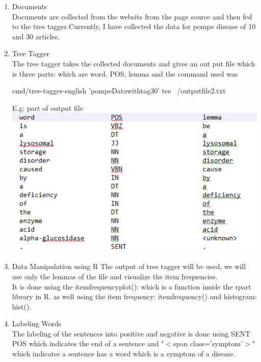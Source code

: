 \documentclass{article}
\begin{document}
	\begin{enumerate} 
		\item Documents\\
		Documents are collected from the website from the page source and then fed to the tree tagger.Currently, I have collected the data for pompe disease of 10 and 30 articles. 
		\item Tree Tagger\\ 
		The tree tagger takes the collected documents and gives an out put file which is three parts: which are word, POS, lemma and the command used was 
		
		cmd/tree-tagger-english 'pompeDatawithtag30' tee ~/outputfile2.txt
		
		\newpage
		E.g: part of output file\\
		\includegraphics[scale=0.8]{eg.PNG}\\   
		\item Data Manipulation using R
		The output of tree tagger will be used, we will use only the lemmas of the file and visualize the item frequencies.\\
		It is done using the itemfrequencyplot(): which is a function inside the rpart library in R. as well using the item frequency: itemfrequency() and histogram: hist(). 
		
		
		\item Labeling Words\\
		
		The labeling of the sentences into positive and negative is done using SENT POS which indicates the end of a sentence and "$<$span class='symptom'$>$"  which indicates a sentence has a word which is a symptom of a disease.\\
		
	\end{enumerate}
	
\end{document}
